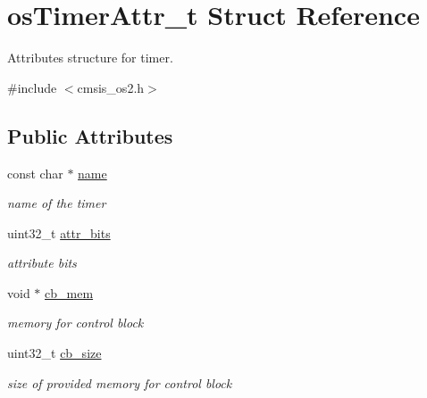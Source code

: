 \hypertarget{structos_timer_attr__t}{}\section{os\+Timer\+Attr\+\_\+t Struct Reference}
\label{structos_timer_attr__t}


Attributes structure for timer.  




{\ttfamily \#include $<$cmsis\+\_\+os2.\+h$>$}

\subsection*{Public Attributes}
\begin{DoxyCompactItemize}
\item 
\mbox{\label{structos_timer_attr__t_a2b432a32e222f51f5c3ed37db14a2db5}} 
const char $\ast$ \mbox{\hyperlink{structos_timer_attr__t_a2b432a32e222f51f5c3ed37db14a2db5}{name}}
\begin{DoxyCompactList}\small\item\em name of the timer \end{DoxyCompactList}\item 
\mbox{\label{structos_timer_attr__t_a7701a75e9afe37e9bd46bb5626e17759}} 
uint32\+\_\+t \mbox{\hyperlink{structos_timer_attr__t_a7701a75e9afe37e9bd46bb5626e17759}{attr\+\_\+bits}}
\begin{DoxyCompactList}\small\item\em attribute bits \end{DoxyCompactList}\item 
\mbox{\label{structos_timer_attr__t_a2a7f8245862c91afe08d0c671ded2fd3}} 
void $\ast$ \mbox{\hyperlink{structos_timer_attr__t_a2a7f8245862c91afe08d0c671ded2fd3}{cb\+\_\+mem}}
\begin{DoxyCompactList}\small\item\em memory for control block \end{DoxyCompactList}\item 
\mbox{\label{structos_timer_attr__t_aa5c0dc5e54b430c01ca3d212a44e31fb}} 
uint32\+\_\+t \mbox{\hyperlink{structos_timer_attr__t_aa5c0dc5e54b430c01ca3d212a44e31fb}{cb\+\_\+size}}
\begin{DoxyCompactList}\small\item\em size of provided memory for control block \end{DoxyCompactList}\end{DoxyCompactItemize}


